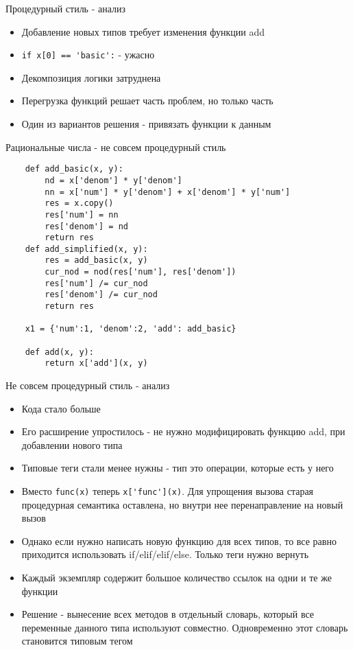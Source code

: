 \documentclass{article}
\begin{document}
\begin{center} Процедурный стиль - анализ \end{center}
\begin{itemize}
    \item Добавление новых типов требует изменения функции add
    \item \lstinline!if x[0] == 'basic':! - ужасно
    \item Декомпозиция логики затруднена
    \item Перегрузка функций решает часть проблем, но только часть
    \item Один из вариантов решения - привязать функции к данным
\end{itemize}
\newpage

\begin{center} Рациональные числа - не совсем процедурный стиль \end{center}
\begin{lstlisting}
    def add_basic(x, y):
        nd = x['denom'] * y['denom']
        nn = x['num'] * y['denom'] + x['denom'] * y['num']
        res = x.copy()
        res['num'] = nn
        res['denom'] = nd
        return res
    def add_simplified(x, y):
        res = add_basic(x, y)
        cur_nod = nod(res['num'], res['denom'])
        res['num'] /= cur_nod
        res['denom'] /= cur_nod
        return res

    x1 = {'num':1, 'denom':2, 'add': add_basic}

    def add(x, y):
        return x['add'](x, y)
\end{lstlisting}
\newpage

\begin{center} Не совсем процедурный стиль - анализ \end{center}
\begin{itemize}
    \item Кода стало больше
    \item Его расширение упростилось - не нужно модифицировать функцию add,
          при добавлении нового типа
    \item Типовые теги стали менее нужны - тип это операции, которые есть у него
    \item Вместо \lstinline!func(x)! теперь \lstinline!x['func'](x)!. 
          Для упрощения вызова старая процедурная семантика оставлена,
          но внутри нее перенаправление на новый вызов
    \item Однако если нужно написать новую функцию для всех типов, то все 
          равно приходится использовать if/elif/elif/else. Только теги нужно 
          вернуть
    \item Каждый экземпляр содержит большое количество ссылок на одни и те же
          функции
    \item Решение - вынесение всех методов в отдельный словарь, который все 
          переменные данного типа используют совместно. Одновременно этот
          словарь становится типовым тегом
\end{itemize}
\newpage
\end{document}
